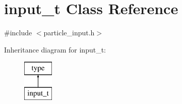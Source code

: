\hypertarget{classinput__t}{}\section{input\+\_\+t Class Reference}
\label{classinput__t}


{\ttfamily \#include $<$particle\+\_\+input.\+h$>$}

Inheritance diagram for input\+\_\+t\+:\begin{figure}[H]
\begin{center}
\leavevmode
\includegraphics[height=2.000000cm]{classinput__t}
\end{center}
\end{figure}
